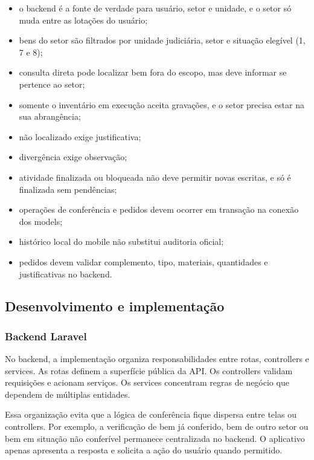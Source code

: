 \documentclass[12pt,a4paper]{article}
\begin{document}
\begin{itemize}
    \item o backend é a fonte de verdade para usuário, setor e unidade, e o setor só muda entre as lotações do usuário;
    \item bens do setor são filtrados por unidade judiciária, setor e situação elegível (1, 7 e 8);
    \item consulta direta pode localizar bem fora do escopo, mas deve informar se pertence ao setor;
    \item somente o inventário em execução aceita gravações, e o setor precisa estar na sua abrangência;
    \item não localizado exige justificativa;
    \item divergência exige observação;
    \item atividade finalizada ou bloqueada não deve permitir novas escritas, e só é finalizada sem pendências;
    \item operações de conferência e pedidos devem ocorrer em transação na conexão dos models;
    \item histórico local do mobile não substitui auditoria oficial;
    \item pedidos devem validar complemento, tipo, materiais, quantidades e justificativas no backend.
\end{itemize}

\subsection{Desenvolvimento e implementação}

\subsubsection{Backend Laravel}

No backend, a implementação organiza responsabilidades entre rotas, controllers e services. As rotas definem a superfície pública da API. Os controllers validam requisições e acionam serviços. Os services concentram regras de negócio que dependem de múltiplas entidades.

Essa organização evita que a lógica de conferência fique dispersa entre telas ou controllers. Por exemplo, a verificação de bem já conferido, bem de outro setor ou bem em situação não conferível permanece centralizada no backend. O aplicativo apenas apresenta a resposta e solicita a ação do usuário quando permitido.
\end{document}
